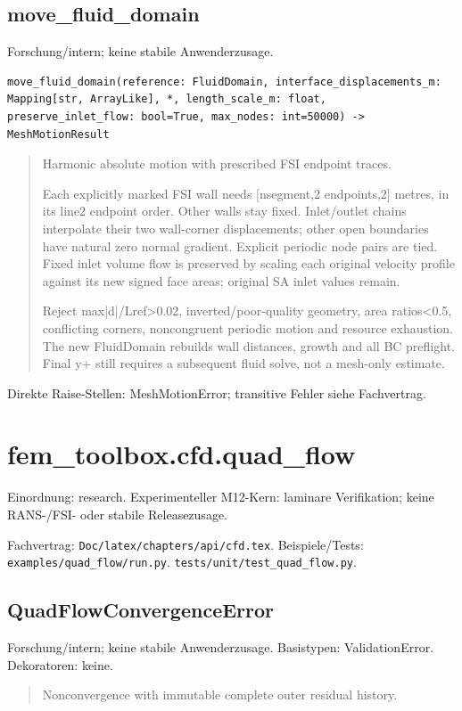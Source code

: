 \subsection{move\_fluid\_domain}
Forschung/intern; keine stabile Anwenderzusage.
\begin{lstlisting}
move_fluid_domain(reference: FluidDomain, interface_displacements_m: Mapping[str, ArrayLike], *, length_scale_m: float, preserve_inlet_flow: bool=True, max_nodes: int=50000) -> MeshMotionResult
\end{lstlisting}
\begin{quote}
Harmonic absolute motion with prescribed FSI endpoint traces.\par Each explicitly marked FSI wall needs [nsegment,2 endpoints,2] metres, in its line2 endpoint order. Other walls stay fixed. Inlet/outlet chains interpolate their two wall-corner displacements; other open boundaries have natural zero normal gradient. Explicit periodic node pairs are tied. Fixed inlet volume flow is preserved by scaling each original velocity profile against its new signed face areas; original SA inlet values remain.\par Reject max|d|/Lref>0.02, inverted/poor-quality geometry, area ratios<0.5, conflicting corners, noncongruent periodic motion and resource exhaustion. The new FluidDomain rebuilds wall distances, growth and all BC preflight. Final y+ still requires a subsequent fluid solve, not a mesh-only estimate.
\end{quote}
Direkte Raise-Stellen: MeshMotionError; transitive Fehler siehe Fachvertrag.
\section{fem\_toolbox.cfd.quad\_flow}
Einordnung: research. Experimenteller M12-Kern: laminare Verifikation; keine RANS-/FSI- oder stabile Releasezusage.
\par Fachvertrag: \nolinkurl{Doc/latex/chapters/api/cfd.tex}. Beispiele/Tests:
\nolinkurl{examples/quad_flow/run.py}.
\nolinkurl{tests/unit/test_quad_flow.py}.
\subsection{QuadFlowConvergenceError}
Forschung/intern; keine stabile Anwenderzusage.
Basistypen: ValidationError. Dekoratoren: keine.
\begin{quote}
Nonconvergence with immutable complete outer residual history.
\end{quote}
